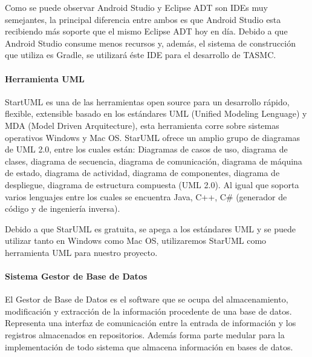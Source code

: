 Como se puede observar Android Studio y Eclipse ADT son IDEs muy semejantes, la principal diferencia entre ambos es que Android Studio esta recibiendo más soporte que el mismo Eclipse ADT hoy en día. Debido a que Android Studio consume menos recursos y, además, el sistema de construcción que utiliza es Gradle, se utilizará éste IDE para el desarrollo de TASMC.

\paragraph{Herramienta UML}

StartUML es una de las herramientas open source para un desarrollo rápido, flexible, extensible basado en los estándares UML (Unified Modeling Lenguage) y MDA (Model Driven Arquitecture), esta herramienta corre sobre sistemas operativos Windows y Mac OS. StarUML ofrece un amplio grupo de diagramas de UML 2.0, entre los cuales están: Diagramas de casos de uso, diagrama de clases, diagrama de secuencia, diagrama de comunicación, diagrama de máquina de estado, diagrama de actividad, diagrama de componentes, diagrama de despliegue, diagrama de estructura compuesta (UML 2.0). Al igual que soporta varios lenguajes entre los cuales se encuentra Java, C++, C\# (generador de código y de ingeniería inversa). \cite{starUML}

Debido a que StarUML es gratuita, se apega a los estándares UML y se puede utilizar tanto en Windows como Mac OS, utilizaremos StarUML como herramienta UML para nuestro proyecto.

\paragraph{Sistema Gestor de Base de Datos}

El Gestor de Base de Datos es el software que se ocupa del almacenamiento, modificación y extracción de la información procedente de una base de datos. Representa una interfaz de comunicación entre la entrada de información y los registros almacenados en repositorios. Además forma parte medular para la implementación de todo sistema que almacena información en bases de datos.

